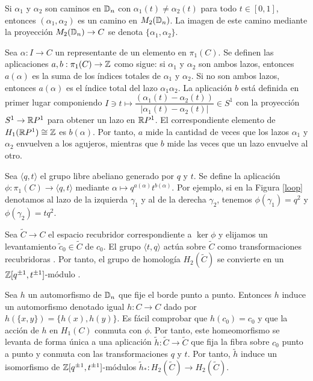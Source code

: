 \documentclass[TFG.tex]{subfiles}
\begin{document}

Si $\alpha_1$ y $\alpha_2$ son caminos en $\mathbb{D}_n$ con $\alpha_1(t)\neq\alpha_2(t)$ para todo $t\in[0,1]$, entonces $(\alpha_1,\alpha_2)$ es un camino en $M_2(\mathbb{D}_n)$. La imagen de este camino mediante la proyección $M_2(\mathbb{D}_n)\to C$ se denota $\{\alpha_1,\alpha_2\}$.

Sea $\alpha:I\to C$ un representante de un elemento en $\pi_1(C)$. Se definen las aplicaciones $a,b:\pi_1(C)\to\mathbb{Z}$ como sigue: si $\alpha_1$ y $\alpha_2$ son ambos lazos, entonces $a(\alpha)$ es la suma de los índices totales de $\alpha_1$ y $\alpha_2$. Si no son ambos lazos, entonces $a(\alpha)$ es el índice total del lazo $\alpha_1\alpha_2$. La aplicación $b$ está definida en primer lugar componiendo $I\ni t\mapsto \dfrac{(\alpha_1(t)-\alpha_2(t))}{|\alpha_1(t)-\alpha_2(t)|}\in S^1$ con la proyección $S^1\to \mathbb{R} P^1$ para obtener un lazo en $\mathbb{R} P^1$. El correspondiente elemento de $H_1(\mathbb{R} P^1)\cong\mathbb{Z}$ es $b(\alpha)$. Por tanto, $a$ mide la cantidad de veces que los lazos $\alpha_1$ y $\alpha_2$ envuelven a los agujeros, mientras que $b$ mide las veces que un lazo envuelve al otro.



Sea $\langle q,t\rangle$ el grupo libre abeliano  generado por $q$ y $t$. Se define la aplicación $\phi:\pi_1(C)\to\langle q,t\rangle$ mediante $\alpha\mapsto q^{a(\alpha)}t^{b(\alpha)}$. Por ejemplo, si en la Figura \ref{loop} denotamos al lazo de la izquierda $\gamma_1$ y al de la derecha $\gamma_2$, tenemos $\phi(\gamma_1)=q^2$ y $\phi(\gamma_2)=tq^2$. 

Sea $\tilde{C}\to C$ el espacio recubridor correspondiente a $\ker\phi$ y elijamos un levantamiento $\tilde{c}_0\in\tilde{C}$ de $c_0$. El grupo $\langle t,q\rangle$ actúa sobre $\tilde{C}$ como transformaciones recubridoras \cite{thesis}. Por tanto, el grupo de homología $H_2(\tilde{C})$ se convierte en un $\mathbb{Z}[q^{\pm 1},t^{\pm 1}]$-módulo \cite{nundam}.

Sea $h$ un automorfismo de $\mathbb{D}_n$ que fije el borde punto a punto. Entonces $h$ induce un automorfismo denotado igual $h:C\to C$ dado por $h(\{x,y\})=\{h(x),h(y)\}$. Es fácil comprobar que $h(c_0)=c_0$ y que la acción de $h$ en $H_1(C)$ conmuta con $\phi$. Por tanto, este homeomorfismo se levanta de forma única a una aplicación $\tilde{h}:\tilde{C}\to\tilde{C}$ que fija la fibra sobre $c_0$ punto a punto y conmuta con las transformaciones $q$ y $t$. Por tanto, $\tilde{h}$ induce un isomorfismo de $\mathbb{Z}[q^{\pm 1},t^{\pm 1}]$-módulos $\tilde{h}_*:H_2(\tilde{C})\to H_2(\tilde{C})$.
\end{document}
